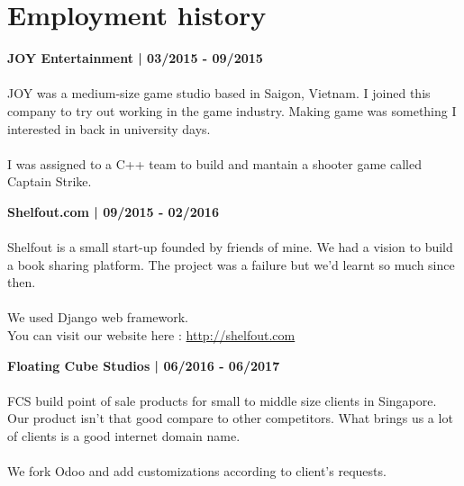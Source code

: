 \documentclass[letterpaper]{article}
\renewenvironment{itemize}{
  \begin{list}{}{
    \setlength{\leftmargin}{1.5em}
  }
}{
  \end{list}
}
\begin{document}
\section*{Employment history}
\begin{itemize}
\item {\bf JOY Entertainment | 03/2015 - 09/2015}
\\
\\
JOY was a medium-size game studio based in Saigon, Vietnam. I joined this company to try out working in the game industry. Making game was something I interested in back in university days.
\\
\\
I was assigned to a C++ team to build and mantain a shooter game called Captain Strike.
\\


\leftskip 0in
\item {\bf Shelfout.com | 09/2015 - 02/2016}
\\
\\
Shelfout is a small start-up founded by friends of mine. We had a vision to build a book sharing platform. The project was a failure but we'd learnt so much since then.
\\
\\
We used Django web framework.
\\
You can visit our website here : 
\href{http://shelfout.com}{http://shelfout.com}


\leftskip 0in
\item {\bf Floating Cube Studios | 06/2016 - 06/2017}
\\
\\
FCS build point of sale products for small to middle size clients in Singapore. Our product isn't that good compare to other competitors. What brings us a lot of clients is a good internet domain name.
\\
\\
We fork Odoo and add customizations according to client's requests.
\\
\\
\end{itemize}
\end{document}
